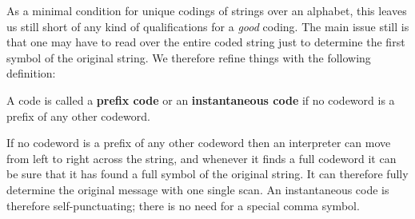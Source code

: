 As a minimal condition for unique codings of strings over an alphabet, this leaves us still short of any kind of qualifications for a \emph{good} coding. The main issue still is that one may have to read over the entire coded string just to determine the first symbol of the original string. We therefore refine things with the following definition:
\begin{definition}
	A code is called a \textbf{prefix code} or an \textbf{instantaneous code} if no codeword is a prefix of any other codeword. 
\end{definition}
If no codeword is a prefix of any other codeword then an interpreter can move from left to right across the string, and whenever it finds a full codeword it can be sure that it has found a full symbol of the original string. It can therefore fully determine the original message with one single scan. An instantaneous code is therefore self-punctuating; there is no need for a special comma symbol.

